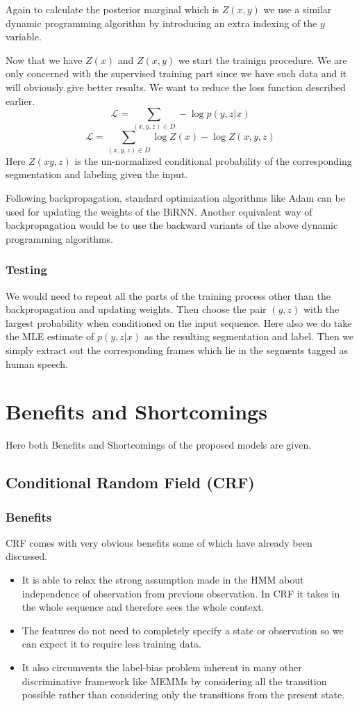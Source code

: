 \documentclass[letterpaper]{article} %
\begin{document}
Again to calculate the posterior marginal which is $Z(x, y)$ we use a similar dynamic programming algorithm by introducing an extra indexing of the $y$ variable.

Now that we have $Z(x)$ and $Z(x,y)$ we start the trainign procedure. We are only concerned with the supervised training part since we have such data and it will obviously give better results. We want to reduce the loss function described earlier. $$\mathcal{L} = \sum_{(x, y, z) \in D} - \log p(y, z |x)$$ $$\mathcal{L} = \sum_{(x, y, z) \in D} \log Z(x) - \log Z(x, y, z)$$ Here $Z(x y, z)$ is the un-normalized conditional probability of the corresponding segmentation and labeling given the input.

Following backpropagation,  standard optimization algorithms like Adam can be used for updating the weights of the BiRNN. Another equivalent way of backpropagation would be to use the backward variants of the above dynamic programming algorithms.

\subsubsection{Testing} We would need to repeat all the parts of the training process other than the backpropagation and updating weights. Then choose the pair $(y, z)$ with the largest probability when conditioned on the input sequence. Here also we do take the MLE estimate of $p(y, z |x)$ as the resulting segmentation and label. Then we simply extract out the corresponding frames which lie in the segments tagged as human speech.

\section{Benefits and Shortcomings}
Here both Benefits and Shortcomings of the proposed models are given.
\subsection{Conditional Random Field (CRF)}
\subsubsection{Benefits} CRF comes with very obvious benefits some of which have already been discussed.
\begin{itemize}
\item It is able to relax the strong assumption made in the HMM about independence of observation from previous observation. In CRF it takes in the whole sequence and therefore sees the whole context.
\item The features do not need to completely specify a state or observation so we can expect it to require less training data.
\item It also circumvents the label-bias problem inherent in many other discriminative framework like MEMMs by considering all the transition possible rather than considering only the transitions from the present state.
\end{itemize}
\end{document}
